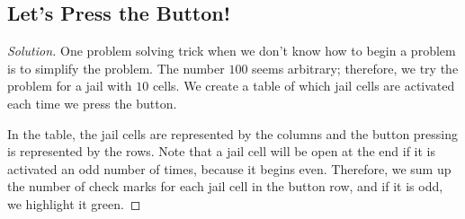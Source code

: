 \subsection*{Let's Press the Button!}
\begin{proof}[Solution]
One problem solving trick when we don't know how to begin a problem is to simplify the problem. The number $100$ seems arbitrary; therefore, we try the problem for a jail with $10$ cells. We create a table of which jail cells are activated each time we press the button.

In the table, the jail cells are represented by the columns and the button pressing is represented by the rows. Note that a jail cell will be open at the end if it is activated an odd number of times, because it begins even. Therefore, we sum up the number of check marks for each jail cell in the button row, and if it is odd, we highlight it green.

\clearpage

\begin{table}[h]
	\centering %
\end{table}


\end{proof}
